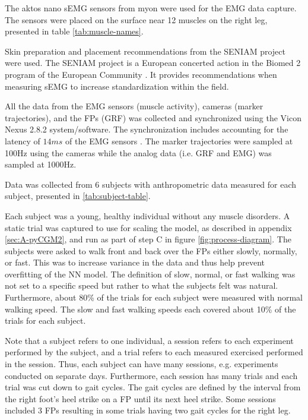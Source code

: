 \documentclass[../main.tex]{subfiles}
\begin{document}
The aktos nano \ac{sEMG} sensors from myon were used for the \ac{EMG} data capture. 
The sensors were placed on the surface near 12 muscles on the right leg, presented in table \ref{tab:muscle-names}. 

Skin preparation and placement recommendations from the SENIAM project \cite{Stegeman2007, Hermens1999, Hermens2000} were used. The SENIAM project is a European concerted action in the Biomed 2 program of the European Community \cite{Stegeman2007}. It provides recommendations when measuring \ac{sEMG} to increase standardization within the field.

All the data from the \ac{EMG} sensors (muscle activity), cameras (marker trajectories), and the \acp{FP} (\ac{GRF}) was collected and synchronized using the Vicon Nexus 2.8.2 system/software.
The synchronization includes accounting for the latency of $14ms$ of the \ac{EMG} sensors \cite{aktosEMG}.
The marker trajectories were sampled at 100Hz using the cameras while the analog data (i.e. \ac{GRF} and \ac{EMG}) was sampled at 1000Hz.

Data was collected from 6 subjects with anthropometric data measured for each subject, presented in \ref{tab:subject-table}.

Each subject was a young, healthy individual without any muscle disorders.
A static trial was captured to use for scaling the model, as described in appendix \ref{sec:A-pyCGM2}, and run as part of step C in figure \ref{fig:process-diagram}.
The subjects were asked to walk front and back over the \acp{FP} either slowly, normally, or fast.
This was to increase variance in the data and thus help prevent overfitting of the \ac{NN} model.
The definition of slow, normal, or fast walking was not set to a specific speed but rather to what the subjects felt was natural.
Furthermore, about 80\% of the trials for each subject were measured with normal walking speed.
The slow and fast walking speeds each covered about 10\% of the trials for each subject.

Note that a subject refers to one individual, a session refers to each experiment performed by the subject, and a trial refers to each measured exercised performed in the session. 
Thus, each subject can have many sessions, e.g. experiments conducted on separate days.
Furthermore, each session has many trials and each trial was cut down to gait cycles. 
The gait cycles are defined by the interval from the right foot's heel strike on a \ac{FP} until its next heel strike.
Some sessions included 3 \acp{FP} resulting in some trials having two gait cycles for the right leg.
\end{document}
